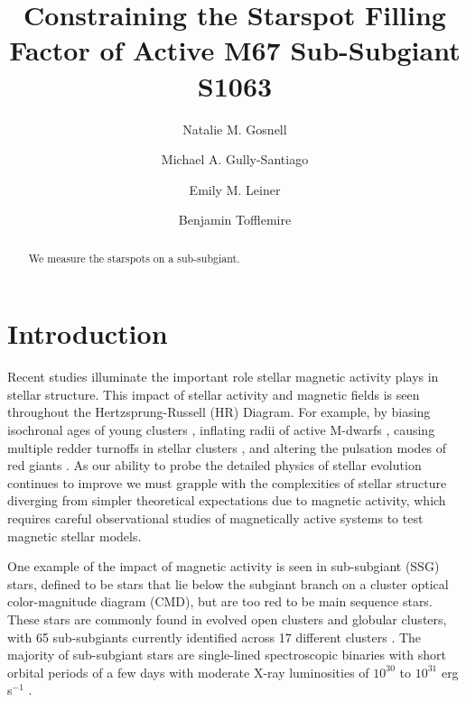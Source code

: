 \documentclass[trackchanges]{aastex631}
\begin{document}

\title{Constraining the Starspot Filling Factor of Active M67 Sub-Subgiant S1063}

\author{Natalie M. Gosnell}
\author{Michael A. Gully-Santiago}
\author{Emily M. Leiner}
\author{Benjamin Tofflemire}


\begin{abstract}

We measure the starspots on a sub-subgiant.

\end{abstract}



\section{Introduction}\label{sec:intro}
Recent studies illuminate the important role stellar magnetic activity plays in stellar structure. This impact of stellar activity and magnetic fields is seen throughout the Hertzsprung-Russell (HR) Diagram. For example, by biasing isochronal ages of young clusters \citep{somers15}, inflating radii of active M-dwarfs \citep{2010AJ....140.1158T,2010ApJ...718..502M,2019MNRAS.483.1125J}, causing multiple redder turnoffs in stellar clusters \citep{2009MNRAS.398L..11B,2019ApJ...876..113S}, and altering the pulsation modes of red giants \citep{2020A&A...639A..63G}. As our ability to probe the detailed physics of stellar evolution continues to improve we must grapple with the complexities of stellar structure diverging from simpler theoretical expectations due to magnetic activity, which requires careful observational studies of magnetically active systems to test magnetic stellar models.

One example of the impact of magnetic activity is seen in sub-subgiant (SSG) stars, defined to be stars that lie below the subgiant branch on a cluster optical color-magnitude diagram (CMD), but are too red to be main sequence stars. These stars are commonly found in evolved open clusters and globular clusters, with 65 sub-subgiants currently identified across 17 different clusters \citep{geller17}. The majority of sub-subgiant stars are single-lined spectroscopic binaries with short orbital periods of a few days with moderate X-ray luminosities of $10^{30}$ to $10^{31}$ erg s$^{-1}$ \citep[and references therein]{geller17}.
\end{document}
